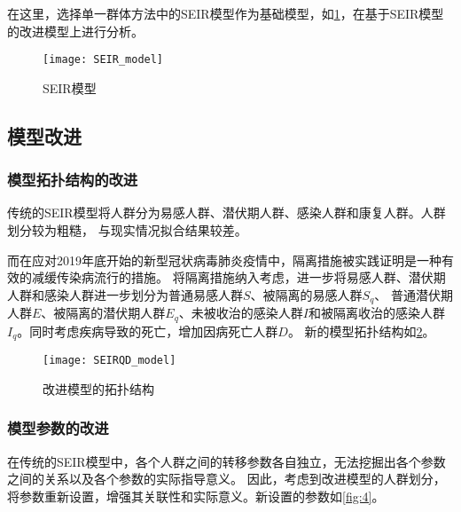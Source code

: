 \documentclass[withoutpreface,bwprint]{cumcmthesis}
\begin{document}
\par
在这里，选择单一群体方法中的SEIR模型作为基础模型，如\cref{fig:2}，在基于SEIR模型的改进模型上进行分析。
\begin{figure}[!h]
    \centering
    \texttt{[image: SEIR\_model]}
    \caption{SEIR模型}
    \label{fig:2}
\end{figure}

\subsection{模型改进}
\subsubsection{模型拓扑结构的改进}
传统的SEIR模型将人群分为易感人群、潜伏期人群、感染人群和康复人群。人群划分较为粗糙，
与现实情况拟合结果较差。

而在应对2019年底开始的新型冠状病毒肺炎疫情中，隔离措施被实践证明是一种有效的减缓传染病流行的措施。
将隔离措施纳入考虑，进一步将易感人群、潜伏期人群和感染人群进一步划分为普通易感人群$S$、被隔离的易感人群$S_q$、
普通潜伏期人群$E$、被隔离的潜伏期人群$E_q$、未被收治的感染人群$I$和被隔离收治的感染人群$I_q$。同时考虑疾病导致的死亡，增加因病死亡人群$D$。
新的模型拓扑结构如\cref{fig:3}。

\begin{figure}[!h]
    \centering
    \texttt{[image: SEIRQD\_model]}
    \caption{改进模型的拓扑结构}
    \label{fig:3}
\end{figure}


\subsubsection{模型参数的改进}
在传统的SEIR模型中，各个人群之间的转移参数各自独立，无法挖掘出各个参数之间的关系以及各个参数的实际指导意义。
因此，考虑到改进模型的人群划分，将参数重新设置，增强其关联性和实际意义。新设置的参数如\cref{fig:4}。
\end{document}
